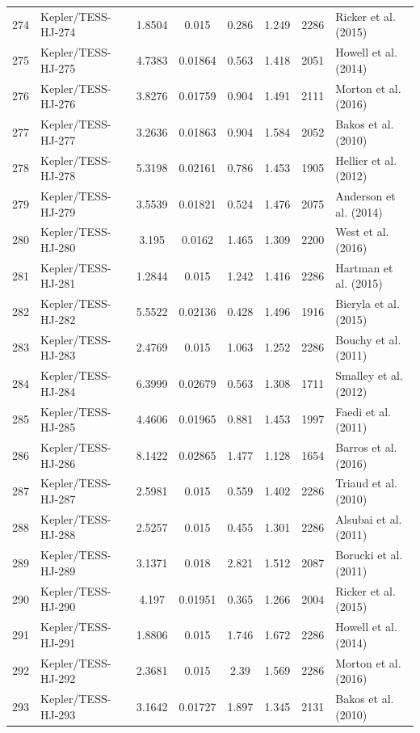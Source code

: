 \begin{longtable}{r l c c c c c p{4.2cm}}
274 & Kepler/TESS-HJ-274 & 1.8504 & 0.015 & 0.286 & 1.249 & 2286 & Ricker et al. (2015) \\
275 & Kepler/TESS-HJ-275 & 4.7383 & 0.01864 & 0.563 & 1.418 & 2051 & Howell et al. (2014) \\
276 & Kepler/TESS-HJ-276 & 3.8276 & 0.01759 & 0.904 & 1.491 & 2111 & Morton et al. (2016) \\
277 & Kepler/TESS-HJ-277 & 3.2636 & 0.01863 & 0.904 & 1.584 & 2052 & Bakos et al. (2010) \\
278 & Kepler/TESS-HJ-278 & 5.3198 & 0.02161 & 0.786 & 1.453 & 1905 & Hellier et al. (2012) \\
279 & Kepler/TESS-HJ-279 & 3.5539 & 0.01821 & 0.524 & 1.476 & 2075 & Anderson et al. (2014) \\
280 & Kepler/TESS-HJ-280 & 3.195 & 0.0162 & 1.465 & 1.309 & 2200 & West et al. (2016) \\
281 & Kepler/TESS-HJ-281 & 1.2844 & 0.015 & 1.242 & 1.416 & 2286 & Hartman et al. (2015) \\
282 & Kepler/TESS-HJ-282 & 5.5522 & 0.02136 & 0.428 & 1.496 & 1916 & Bieryla et al. (2015) \\
283 & Kepler/TESS-HJ-283 & 2.4769 & 0.015 & 1.063 & 1.252 & 2286 & Bouchy et al. (2011) \\
284 & Kepler/TESS-HJ-284 & 6.3999 & 0.02679 & 0.563 & 1.308 & 1711 & Smalley et al. (2012) \\
285 & Kepler/TESS-HJ-285 & 4.4606 & 0.01965 & 0.881 & 1.453 & 1997 & Faedi et al. (2011) \\
286 & Kepler/TESS-HJ-286 & 8.1422 & 0.02865 & 1.477 & 1.128 & 1654 & Barros et al. (2016) \\
287 & Kepler/TESS-HJ-287 & 2.5981 & 0.015 & 0.559 & 1.402 & 2286 & Triaud et al. (2010) \\
288 & Kepler/TESS-HJ-288 & 2.5257 & 0.015 & 0.455 & 1.301 & 2286 & Alsubai et al. (2011) \\
289 & Kepler/TESS-HJ-289 & 3.1371 & 0.018 & 2.821 & 1.512 & 2087 & Borucki et al. (2011) \\
290 & Kepler/TESS-HJ-290 & 4.197 & 0.01951 & 0.365 & 1.266 & 2004 & Ricker et al. (2015) \\
291 & Kepler/TESS-HJ-291 & 1.8806 & 0.015 & 1.746 & 1.672 & 2286 & Howell et al. (2014) \\
292 & Kepler/TESS-HJ-292 & 2.3681 & 0.015 & 2.39 & 1.569 & 2286 & Morton et al. (2016) \\
293 & Kepler/TESS-HJ-293 & 3.1642 & 0.01727 & 1.897 & 1.345 & 2131 & Bakos et al. (2010) \\

\end{longtable}
